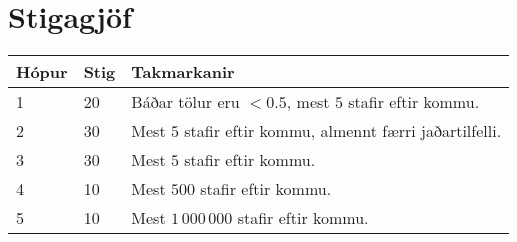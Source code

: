\section*{Stigagjöf}
\begin{tabular}{|l|l|l|}
\hline
Hópur & Stig & Takmarkanir \\ \hline
1     & 20   & Báðar tölur eru $< 0.5$, mest $5$ stafir eftir kommu. \\ \hline
2     & 30   & Mest $5$ stafir eftir kommu, almennt færri jaðartilfelli. \\ \hline
3     & 30   & Mest $5$ stafir eftir kommu. \\ \hline
4     & 10   & Mest $500$ stafir eftir kommu. \\ \hline
5     & 10   & Mest $1\,000\,000$ stafir eftir kommu. \\ \hline
\end{tabular}
